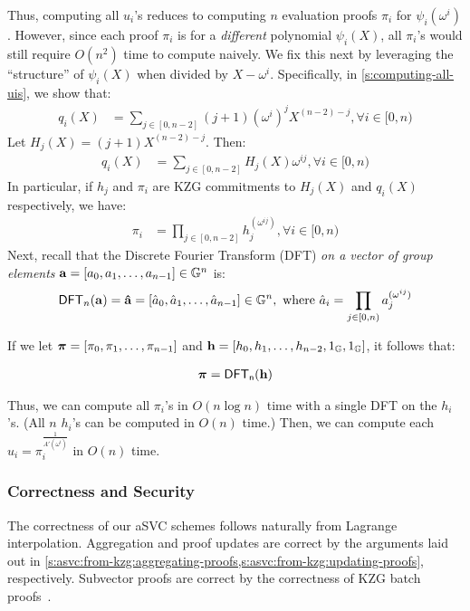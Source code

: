 Thus, computing all $u_i$'s reduces to computing $n$ evaluation proofs $\pi_i$ for $\psi_i(\omega^i)$.
However, since each proof $\pi_i$ is for a \textit{different} polynomial $\psi_i(X)$, all $\pi_i$'s would still require $O(n^2)$ time to compute naively.
We fix this next by leveraging the ``structure'' of $\psi_i(X)$ when divided by $X-\omega^i$.
Specifically, in \cref{s:computing-all-uis}, we show that:
\begin{align}
\label{eq:ui-qi}
q_i(X) &= \sum_{j\in [0,n-2]} (j+1)(\omega^i)^j X^{(n - 2) - j},\forall i \in [0,n)
\end{align}
Let $H_j(X) = (j+1) X^{(n-2)-j}$.
Then:
\begin{align}
q_i(X) &= \sum_{j\in [0,n-2]} H_j(X) \omega^{ij},\forall i \in [0,n)
\end{align}
In particular, if $h_j$ and $\pi_i$ are KZG commitments to $H_j(X)$ and $q_i(X)$ respectively, we have:
\begin{align}
\pi_i &= \prod_{j\in [0,n-2]} h_j^{(\omega^{ij})},\forall i \in [0,n)
\end{align}
Next, recall that the Discrete Fourier Transform (DFT) \textit{on a vector of group elements} $\bm{\mathrm{a}}=[a_0, a_1, \dots, a_{n-1}]\in \mathbb{G}^n$ is:
\begin{align}
\mathsf{DFT}_n(\bm{\mathrm{a}}) = \bm{\mathrm{\hat{a}}}=[\hat{a}_0, \hat{a}_1, \dots, \hat{a}_{n-1}]\in \mathbb{G}^n,\ \text{where}\ \hat{a}_i= \prod_{j\in [0,n)} a_j^{(\omega^{ij})}
\end{align}

If we let $\bm{\mathrm{\pi}}=[\pi_0, \pi_1, \dots, \pi_{n-1}]$ and $\bm{\mathrm{h}} = [h_0, h_1, \dots, h_{n-2}, 1_{\mathbb{G}}, 1_{\mathbb{G}}]$, it  follows that:

\begin{align}
\bm{\mathrm{\pi}} = \mathsf{DFT_n}(\bm{\mathrm{h}})
\end{align}

Thus, we can compute all $\pi_i$'s in $O(n\log{n})$ time with a single DFT on the $h_i$'s.
(All $n$ $h_i$'s can be computed in $O(n)$ time.)
Then, we can compute each $u_i=\pi_i^{\frac{1}{A'(\omega^i)}}$ in $O(n)$ time.

\subsubsection{Correctness and Security}
\label{s:svc:correctness-and-security}
The correctness of our aSVC schemes follows naturally from Lagrange interpolation.
Aggregation and proof updates are correct by the arguments laid out in \cref{s:asvc:from-kzg:aggregating-proofs,s:asvc:from-kzg:updating-proofs}, respectively.
Subvector proofs are correct by the correctness of KZG batch proofs~\cite{KZG10a}.

